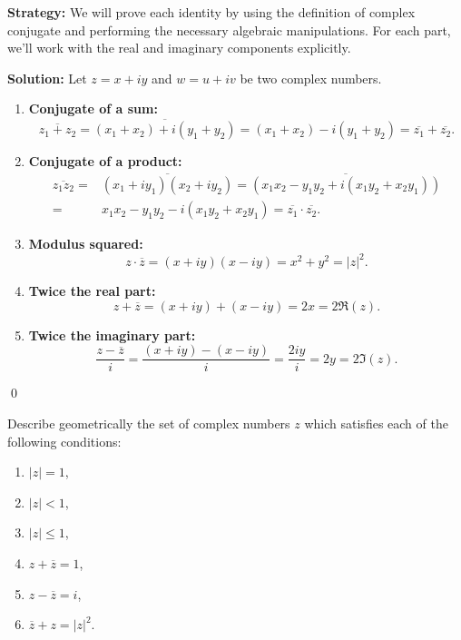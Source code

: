 \noindent\textbf{Strategy:} We will prove each identity by using the definition of complex conjugate and performing the necessary algebraic manipulations. For each part, we'll work with the real and imaginary components explicitly.

\bigskip\noindent\textbf{Solution:}
Let \( z = x + iy \) and \( w = u + iv \) be two complex numbers.

\begin{enumerate}[label=\alph*)]

\item \textbf{Conjugate of a sum:}
\[
\overline{z_1 + z_2} = \overline{(x_1 + x_2) + i(y_1 + y_2)} = (x_1 + x_2) - i(y_1 + y_2) = \overline{z_1} + \overline{z_2}.
\]

\item \textbf{Conjugate of a product:}
\begin{align*}
\overline{z_1 z_2} =& \overline{(x_1 + iy_1)(x_2 + iy_2)} = \overline{(x_1 x_2 - y_1 y_2 + i(x_1 y_2 + x_2 y_1))} \\
=& x_1 x_2 - y_1 y_2 - i(x_1 y_2 + x_2 y_1) = \overline{z_1} \cdot \overline{z_2}.
\end{align*}
\item \textbf{Modulus squared:}
\[
z \cdot \overline{z} = (x + iy)(x - iy) = x^2 + y^2 = |z|^2.
\]

\item \textbf{Twice the real part:}
\[
z + \overline{z} = (x + iy) + (x - iy) = 2x = 2 \Re(z).
\]

\item \textbf{Twice the imaginary part:}
\[
\frac{z - \overline{z}}{i} = \frac{(x + iy) - (x - iy)}{i} = \frac{2iy}{i} = 2y = 2 \Im(z).
\]

\end{enumerate}\qed


\begin{problembox}
Describe geometrically the set of complex numbers \( z \) which satisfies each of the following conditions:
\begin{enumerate}[label=\alph*)]
\item \( |z| = 1 \),
\item \( |z| < 1 \),
\item \( |z| \leq 1 \),
\item \( z + \overline{z} = 1 \),
\item \( z - \overline{z} = i \),
\item \( \overline{z} + z = |z|^2 \).
\end{enumerate}
\end{problembox}

